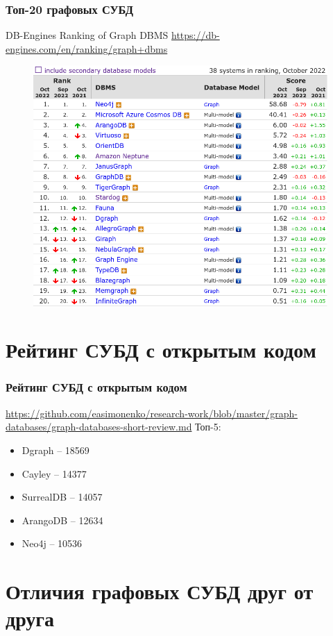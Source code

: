\documentclass[11pt]{beamer}
\begin{document}
\begin{frame}
  \frametitle{Топ-20 графовых СУБД}
  DB-Engines Ranking of Graph DBMS \url{https://db-engines.com/en/ranking/graph+dbms}
  \begin{figure}[h!]
    \includegraphics[scale=0.3]{db-engines_top-20-graph-dbms_2022-10-24_15-23-28.png}
  \end{figure}
\end{frame}

\section{Рейтинг СУБД с открытым кодом}

\begin{frame}
  \frametitle{Рейтинг СУБД с открытым кодом}
  \url{https://github.com/easimonenko/research-work/blob/master/graph-databases/graph-databases-short-review.md}
  Топ-5:
  \begin{itemize}
  \item Dgraph -- 18569
  \item Cayley -- 14377
  \item SurrealDB -- 14057
  \item ArangoDB -- 12634
  \item Neo4j -- 10536
  \end{itemize}
\end{frame}

\section{Отличия графовых СУБД друг от друга}
\end{document}
